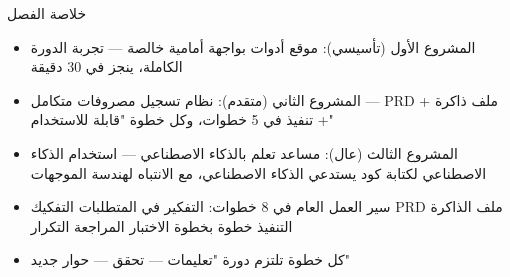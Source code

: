 \begin{tcbsummary}{خلاصة الفصل}
\begin{itemize}
  \item المشروع الأول (تأسيسي): موقع أدوات بواجهة أمامية خالصة — تجربة الدورة الكاملة، ينجز في 30 دقيقة
  \item المشروع الثاني (متقدم): نظام تسجيل مصروفات متكامل — PRD + ملف ذاكرة + تنفيذ في 5 خطوات، وكل خطوة "قابلة للاستخدام"
  \item المشروع الثالث (عال): مساعد تعلم بالذكاء الاصطناعي — استخدام الذكاء الاصطناعي لكتابة كود يستدعي الذكاء الاصطناعي، مع الانتباه لهندسة الموجهات
  \item سير العمل العام في 8 خطوات: التفكير في المتطلبات التفكيك PRD ملف الذاكرة التنفيذ خطوة بخطوة الاختبار المراجعة التكرار
  \item كل خطوة تلتزم دورة "تعليمات — تحقق — حوار جديد"
\end{itemize}

\end{tcbsummary}
